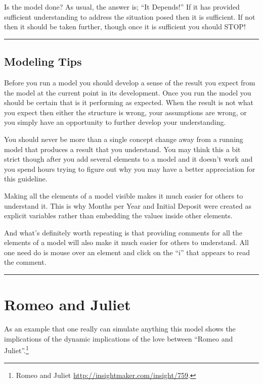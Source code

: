 \documentclass[]{memoir}
\begin{document}
Is the model done? As usual, the answer is; ``It Depends!'' If it has
provided sufficient understanding to address the situation posed then it
is sufficient. If not then it should be taken further, though once it is
sufficient you should STOP!

\begin{center}\rule{3in}{0.4pt}\end{center}

\subsection{Modeling Tips}

Before you run a model you should develop a sense of the result you
expect from the model at the current point in its development. Once you
run the model you should be certain that is it performing as expected.
When the result is not what you expect then either the structure is
wrong, your assumptions are wrong, or you simply have an opportunity to
further develop your understanding.

You should never be more than a single concept change away from a
running model that produces a result that you understand. You may think
this a bit strict though after you add several elements to a model and
it doesn't work and you spend hours trying to figure out why you may
have a better appreciation for this guideline.

Making all the elements of a model visible makes it much easier for
others to understand it. This is why Months per Year and Initial Deposit
were created as explicit variables rather than embedding the values
inside other elements.

And what's definitely worth repeating is that providing comments for all
the elements of a model will also make it much easier for others to
understand. All one need do is mouse over an element and click on the
``i'' that appears to read the comment.

\begin{center}\rule{3in}{0.4pt}\end{center}

\section{Romeo and Juliet}

As an example that one really can simulate anything this model shows the
implications of the dynamic implications of the love between ``Romeo and
Juliet''.\footnote{Romeo and Juliet
  \url{http://insightmaker.com/insight/759}.}
\end{document}
